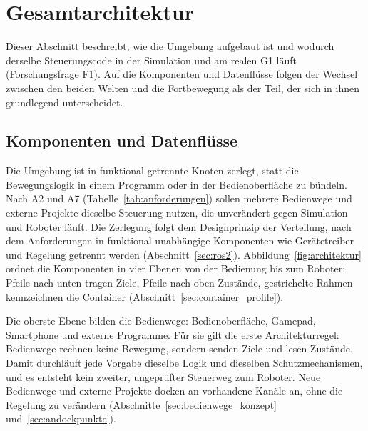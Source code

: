 
\section{Gesamtarchitektur}
\label{sec:architektur}
Dieser Abschnitt beschreibt, wie die Umgebung aufgebaut ist und wodurch derselbe Steuerungscode in der Simulation und am realen G1 läuft (Forschungsfrage F1).
Auf die Komponenten und Datenflüsse folgen der Wechsel zwischen den beiden Welten und die Fortbewegung als der Teil, der sich in ihnen grundlegend unterscheidet.

\subsection{Komponenten und Datenflüsse}
\label{sec:komponenten}
Die Umgebung ist in funktional getrennte Knoten zerlegt, statt die Bewegungslogik in einem Programm oder in der Bedienoberfläche zu bündeln.
Nach A2 und A7 (Tabelle~\ref{tab:anforderungen}) sollen mehrere Bedienwege und externe Projekte dieselbe Steuerung nutzen, die unverändert gegen Simulation und Roboter läuft.
Die Zerlegung folgt dem Designprinzip der Verteilung, nach dem Anforderungen in funktional unabhängige Komponenten wie Gerätetreiber und Regelung getrennt werden \cite{Macenski2022} (Abschnitt~\ref{sec:ros2}).
Abbildung~\ref{fig:architektur} ordnet die Komponenten in vier Ebenen von der Bedienung bis zum Roboter; Pfeile nach unten tragen Ziele, Pfeile nach oben Zustände, gestrichelte Rahmen kennzeichnen die Container (Abschnitt~\ref{sec:container_profile}).

Die oberste Ebene bilden die Bedienwege: Bedienoberfläche, Gamepad, Smartphone und externe Programme.
Für sie gilt die erste Architekturregel: Bedienwege rechnen keine Bewegung, sondern senden Ziele und lesen Zustände.
Damit durchläuft jede Vorgabe dieselbe Logik und dieselben Schutzmechanismen, und es entsteht kein zweiter, ungeprüfter Steuerweg zum Roboter.
Neue Bedienwege und externe Projekte docken an vorhandene Kanäle an, ohne die Regelung zu verändern (Abschnitte~\ref{sec:bedienwege_konzept} und~\ref{sec:andockpunkte}).

